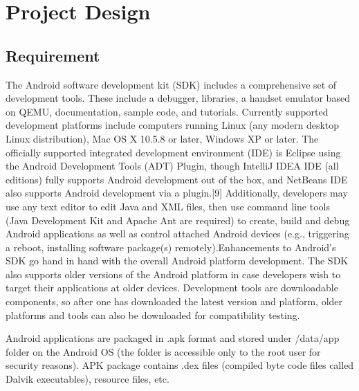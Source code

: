 \titleformat{\chapter}[display]
{\normalfont\Large\bfseries}{\centering\chaptertitlename\ \thechapter}{12pt}{\Large}
\titlespacing*{\chapter}{0pt}{0pt}{10pt}
\chapter{Project Design}

\section{Requirement}


The Android software development kit (SDK) includes a comprehensive set of development tools. These include a debugger, libraries, a handset emulator based on QEMU, documentation, sample code, and tutorials. Currently supported development platforms include computers running Linux (any modern desktop Linux distribution), Mac OS X 10.5.8 or later, Windows XP or later. The officially supported integrated development environment (IDE) is Eclipse using the Android Development Tools (ADT) Plugin, though IntelliJ IDEA IDE (all editions) fully supports Android development out of the box, and NetBeans IDE also supports Android development via a plugin.[9] Additionally, developers may use any text editor to edit Java and XML files, then use command line tools (Java Development Kit and Apache Ant are required) to create, build and debug Android applications as well as control attached Android devices (e.g., triggering a reboot, installing software package(s) remotely).Enhancements to Android's SDK go hand in hand with the overall Android platform development. The SDK also supports older versions of the Android platform in case developers wish to target their applications at older devices. Development tools are downloadable components, so after one has downloaded the latest version and platform, older platforms and tools can also be downloaded for compatibility testing.

Android applications are packaged in .apk format and stored under /data/app folder on the Android OS (the folder is accessible only to the root user for security reasons). APK package contains .dex files (compiled byte code files called Dalvik executables), resource files, etc.

